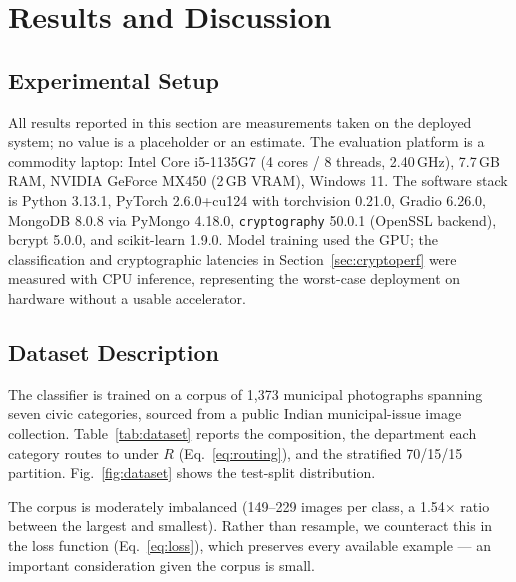 \documentclass[conference]{IEEEtran}
\begin{document}
\section{Results and Discussion}
\label{sec:results}

\subsection{Experimental Setup}
All results reported in this section are measurements taken on the deployed system; no value is a placeholder or an estimate. The evaluation platform is a commodity laptop: Intel Core i5-1135G7 (4 cores / 8 threads, 2.40\,GHz), 7.7\,GB RAM, NVIDIA GeForce MX450 (2\,GB VRAM), Windows 11. The software stack is Python 3.13.1, PyTorch 2.6.0+cu124 with torchvision 0.21.0, Gradio 6.26.0, MongoDB 8.0.8 via PyMongo 4.18.0, \texttt{cryptography} 50.0.1 (OpenSSL backend), bcrypt 5.0.0, and scikit-learn 1.9.0. Model training used the GPU; the classification and cryptographic latencies in Section~\ref{sec:cryptoperf} were measured with CPU inference, representing the worst-case deployment on hardware without a usable accelerator.

\subsection{Dataset Description}
The classifier is trained on a corpus of 1{,}373 municipal photographs spanning seven civic categories, sourced from a public Indian municipal-issue image collection. Table~\ref{tab:dataset} reports the composition, the department each category routes to under $R$ (Eq.~\ref{eq:routing}), and the stratified 70/15/15 partition. Fig.~\ref{fig:dataset} shows the test-split distribution.

The corpus is moderately imbalanced (149--229 images per class, a 1.54$\times$ ratio between the largest and smallest). Rather than resample, we counteract this in the loss function (Eq.~\ref{eq:loss}), which preserves every available example --- an important consideration given the corpus is small.
\end{document}
